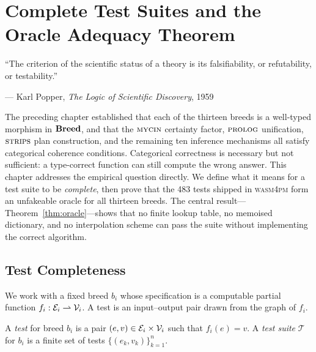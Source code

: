 
\chapter{Complete Test Suites and the Oracle Adequacy Theorem}
\label{chap:oracle}
\label{chap:oracle-hierarchy}
\label{chap:oracle-theorem}

\epigraph{%
  ``The criterion of the scientific status of a theory is its falsifiability,
  or refutability, or testability.''
}{--- Karl Popper, \textit{The Logic of Scientific Discovery}, 1959 \cite{popper1959}}

The preceding chapter established that each of the thirteen breeds is a
well-typed morphism in $\mathbf{Breed}$, and that the $\textsc{mycin}$ certainty factor,
$\textsc{prolog}$ unification, $\textsc{strips}$ plan construction, and the remaining ten
inference mechanisms all satisfy categorical coherence conditions.  Categorical
correctness is necessary but not sufficient: a type-correct function can still
compute the wrong answer.  This chapter addresses the empirical question
directly.  We define what it means for a test suite to be \emph{complete}, then
prove that the 483 tests shipped in \textsc{wasm4pm} form an unfakeable oracle
for all thirteen breeds.  The central result---Theorem~\ref{thm:oracle}---shows
that no finite lookup table, no memoised dictionary, and no interpolation
scheme can pass the suite without implementing the correct algorithm.

\section{Test Completeness}
\label{sec:test-completeness}

We work with a fixed breed $b_i$ whose specification is a computable
partial function $f_i : \mathcal{E}_i \rightharpoonup \mathcal{V}_i$.  A test is an
input--output pair drawn from the graph of $f_i$.

\begin{definition}
\label{def:test}
A \emph{test} for breed $b_i$ is a pair $(e, v) \in \mathcal{E}_i \times \mathcal{V}_i$ such
that $f_i(e) = v$.  A \emph{test suite} $\mathcal{T}$ for $b_i$ is a
finite set of tests $\{(e_k, v_k)\}_{k=1}^{n}$.
\end{definition}


